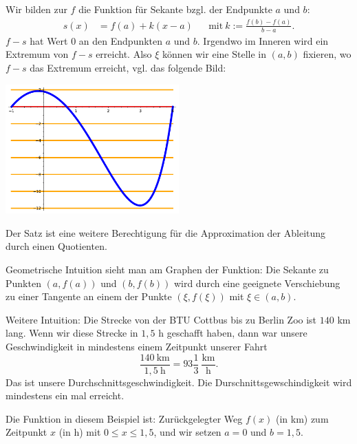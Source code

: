 \begin{bem}
	Wir bilden zur $f$ die Funktion für Sekante bzgl. der Endpunkte $a$ und $b$: 
	\begin{align*}
			s(x) & = f(a) + k (x-a)  & & \text{mit}  \ k := \frac{f(b) - f(a)}{b-a}. 
	\end{align*} 
	$f-s$ hat Wert $0$ an den Endpunkten $a$ und $b$. 
	Irgendwo im Inneren wird ein Extremum von $f-s$ erreicht. 
	Also $\xi$ können wir eine Stelle in $(a,b)$ fixieren, wo $f-s$ das Extremum erreicht, vgl. das folgende Bild: 
\begin{center}
	\includegraphics[width=0.5\textwidth]{pics/mittelwertsatz2.pdf}
\end{center} 
\end{bem} 

\begin{bem}
	Der Satz ist eine weitere Berechtigung für die Approximation der Ableitung durch einen Quotienten.
\end{bem} 

\begin{bem} 
	Geometrische Intuition sieht man am Graphen der Funktion: Die Sekante zu Punkten $(a,f(a))$ und $(b,f(b))$ wird durch eine geeignete Verschiebung zu einer Tangente an einem der Punkte $(\xi,f(\xi))$ mit $\xi \in (a,b)$. 
\end{bem} 


\begin{bem} 
	Weitere Intuition: Die Strecke von der BTU Cottbus bis zu Berlin Zoo ist $140$ km lang. Wenn wir diese Strecke in $1{,}5$ h geschafft haben, dann war unsere Geschwindigkeit in mindestens einem Zeitpunkt unserer Fahrt 
	\[
		\frac{140 \ \text{km} }{1{,}5 \ \text{h}} = 93 \frac{1}{3} \ \frac{\text{km}}{\text{h}}.
	\] 
	Das ist unsere Durchschnittsgeschwindigkeit. Die Durschnittsgewschindigkeit wird mindestens ein mal erreicht. 
	
	Die Funktion in diesem Beispiel ist: Zurückgelegter Weg $f(x)$ (in km) zum Zeitpunkt $x$ (in h) mit $0 \le x \le 1{,}5$, und wir setzen $a=0$ und $b=1{,}5$. 
\end{bem} 

